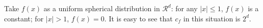Take $f(x)$ as a uniform spherical distribution in $\mathcal{R}^d$: for any $|x|
\le 1$, $f(x)$ is a constant; for $|x| > 1$, $f(x) = 0$.  It is easy to see that
$c_f$ in this situation is $2^d$. %



